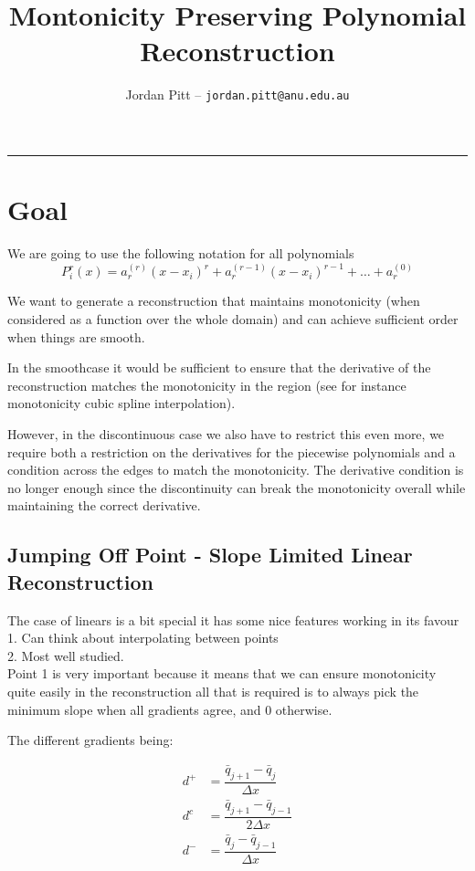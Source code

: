 \documentclass[10pt]{article}
\title{Montonicity Preserving Polynomial Reconstruction}
\author{Jordan Pitt -- \texttt{jordan.pitt@anu.edu.au}}
\begin{document}
\maketitle

\vspace{-0.3in}
\noindent
\rule{\linewidth}{0.4pt}

\section{Goal}
We are going to use the following notation for all polynomials
\[P^r_i(x) = a^{(r)}_r(x  - x_i)^r + a^{(r-1)}_r(x  - x_i)^{r-1} + \dots + a^{(0)}_r\]

We want to generate a reconstruction that maintains monotonicity (when considered as a function over the whole domain) and can achieve sufficient order when things are smooth.

In the smoothcase it would be sufficient to ensure that the derivative of the reconstruction matches the monotonicity in the region (see for instance monotonicity cubic spline interpolation).

However, in the discontinuous case we also have to restrict this even more, we require both a restriction on the derivatives for the piecewise polynomials and a condition across the edges to match the monotonicity. The derivative condition is no longer enough since  the discontinuity can break the monotonicity overall while maintaining the correct derivative. 

\subsection{Jumping Off Point - Slope Limited Linear Reconstruction}
The case of linears is a bit special it has some nice features working in its favour \\
1. Can think about interpolating between points \\
2. Most well studied.  \\

Point 1 is very important because it means that we can ensure monotonicity quite easily in the reconstruction all that is required is to always pick the minimum slope when all gradients agree, and 0 otherwise. 

The different gradients being:

\begin{align}
d^+ &= \dfrac{\bar{q}_{j+1} - \bar{q}_{j}}{\Delta x}  \\
d^c &= \dfrac{\bar{q}_{j+1} - \bar{q}_{j-1}}{2\Delta x}  \\
d^- &= \dfrac{\bar{q}_{j} - \bar{q}_{j-1}}{\Delta x}
\end{align}
\end{document}
